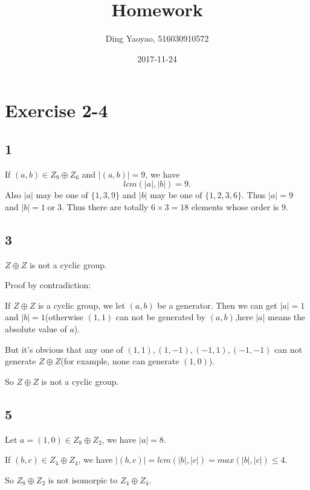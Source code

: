 \documentclass[draft]{article}
\title{Homework}
\date{2017-11-24}
\author{Ding Yaoyao, 516030910572}
\begin{document}
	\maketitle
	\section*{Exercise 2-4}
		\subsection*{1}
			If $(a,b) \in Z_9 \oplus Z_6$ and $\vert (a,b) \vert = 9$, we have 
			$$
				lcm(\vert a \vert, \vert b \vert) = 9.
			$$
			Also $\vert a \vert$ may be one of $\{ 1, 3, 9\}$ and $\vert b \vert$ may be
			one of $\{ 1, 2, 3, 6\}$. Thus $\vert a \vert = 9$ and $\vert b \vert = 1 \;
			\text{or} \; 3$.  Thus there are totally $6 \times 3 = 18$ elements whose order is $9$.
		\subsection*{3}
			$Z\oplus Z$ is not a cyclic group.

			Proof by contradiction:

			If $Z \oplus Z$ is a cyclic group, we let $(a,b)$ be a generator. Then we
			can get $\vert a \vert = 1$ and $\vert b \vert = 1$(otherwise $(1,1)$ can
			not be generated by $(a,b)$,here $\vert a \vert$ means the absolute value of $a$).

			But it's obvious that any one of $(1,1), (1,-1), (-1,1), (-1,-1)$ can not 
			generate $Z \oplus Z$(for example, none can generate $(1,0)$).

			So $Z \oplus Z$ is not a cyclic group.
		\subsection*{5}
			Let $a = (1,0) \in Z_8 \oplus Z_2$, we have $\vert a \vert = 8$.
			
			If $(b,c) \in Z_4 \oplus Z_4$, we have $\vert (b,c) \vert = lcm(\vert b
			\vert, \vert c \vert) = max(\vert b \vert, \vert c \vert) \leq 4$.

			So $Z_8 \oplus Z_2$ is not isomorpic to $Z_4 \oplus Z_4$.
\end{document}
